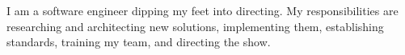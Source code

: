 \documentclass[9pt]{developercv} %
\begin{document}
\vspace{0.5cm}



\begin{minipage}[t]{0.4\textwidth} %
	\vspace{-\baselineskip} %
	
	I am a software engineer dipping my feet into directing. My responsibilities are researching and architecting new solutions, implementing them, establishing standards, training my team, and directing the show.\ %
\end{minipage}
\hfill %
\begin{minipage}[t]{0.5\textwidth} %
	\vspace{-\baselineskip} %
	\begin{barchart}{5.5}
	\end{barchart}
\end{minipage}

\begin{center}
\end{center}


\end{document}
